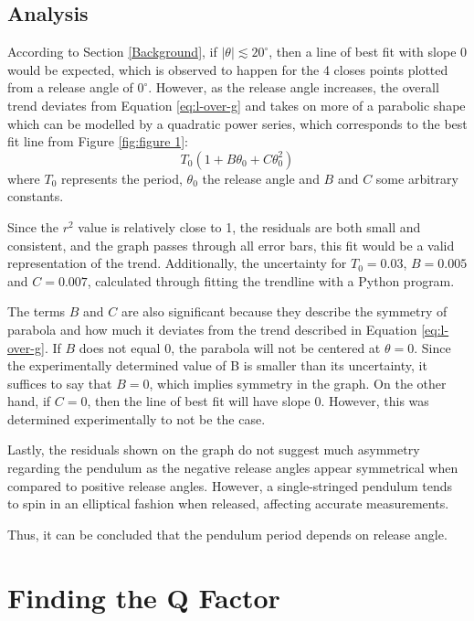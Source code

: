 \documentclass[11pt]{article}
\begin{document}
\begin{multicols}{2}
\subsection{Analysis}
According to Section \ref{Background}, {\color{blue} if $|\theta| \lesssim 20^{\circ}$, then a line of best fit with slope 0 would be expected, which is observed to happen for the 4 closes points plotted from a release angle of $0^\circ$. However, as the release angle increases, the overall trend deviates from Equation \ref{eq:l-over-g} and takes on more of a parabolic shape which can be modelled by a quadratic power series, which corresponds to the best fit line from Figure \ref{fig:figure 1}:}
\begin{equation} \label{eq:power series}
    T_0(1 + B\theta_0 + C\theta_0^2)
\end{equation}
where $T_0$ represents the period, $\theta_0$ the release angle and $B$ and $C$ some arbitrary constants. {\color{blue}Since the $r^2$ value is relatively close to 1, the residuals are both small and consistent, and the graph passes through all error bars, this fit would be a valid representation of the trend. Additionally, the uncertainty for $T_0 = 0.03$, $B = 0.005$ and $C = 0.007$, calculated through fitting the trendline with a Python program.

The terms $B$ and $C$ are also significant because they describe the symmetry of parabola and how much it deviates from the trend described in Equation \ref{eq:l-over-g}. If $B$ does not equal 0, the parabola will not be centered at $\theta = 0$. Since the experimentally determined value of B is smaller than its uncertainty, it suffices to say that $B = 0$, which implies symmetry in the graph. On the other hand, if $C = 0$, then the line of best fit will have slope 0. However, this was determined experimentally to not be the case.

Lastly, the residuals shown on the graph do not suggest much asymmetry regarding the pendulum as the negative release angles appear symmetrical when compared to positive release angles. However, a single-stringed pendulum tends to spin in an elliptical fashion when released, affecting accurate measurements.

Thus, it can be concluded that the pendulum period depends on release angle.}

\section{Finding the Q Factor} \label{Finding the Q Factor}


\end{multicols}
\end{document}
